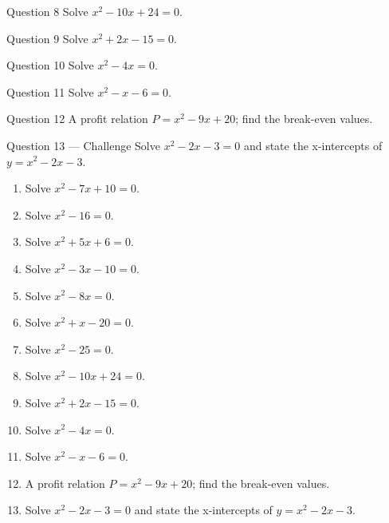 \documentclass[11pt]{article}
\begin{document}
\begin{qbox}{Question 8}
Solve $x^2-10x+24=0$.\workspace{2.4cm}
\end{qbox}

\begin{qbox}{Question 9}
Solve $x^2+2x-15=0$.\workspace{2.4cm}
\end{qbox}

\begin{qbox}{Question 10}
Solve $x^2-4x=0$.\workspace{2.4cm}
\end{qbox}

\begin{qbox}{Question 11}
Solve $x^2-x-6=0$.\workspace{2.4cm}
\end{qbox}

\begin{qbox}{Question 12}
A profit relation $P=x^2-9x+20$; find the break-even values.\workspace{2.4cm}
\end{qbox}

\begin{qbox}{Question 13 --- Challenge}
Solve $x^2-2x-3=0$ and state the x-intercepts of $y=x^2-2x-3$.\workspace{3cm}
\end{qbox}

\clearpage
{}

\begin{recapbox}
\begin{multicols}{2}
\small
\begin{enumerate}[leftmargin=*,itemsep=3pt]
  \item Solve $x^2-7x+10=0$.
  \item Solve $x^2-16=0$.
  \item Solve $x^2+5x+6=0$.
  \item Solve $x^2-3x-10=0$.
  \item Solve $x^2-8x=0$.
  \item Solve $x^2+x-20=0$.
  \item Solve $x^2-25=0$.
  \item Solve $x^2-10x+24=0$.
  \item Solve $x^2+2x-15=0$.
  \item Solve $x^2-4x=0$.
  \item Solve $x^2-x-6=0$.
  \item A profit relation $P=x^2-9x+20$; find the break-even values.
  \item Solve $x^2-2x-3=0$ and state the x-intercepts of $y=x^2-2x-3$.
\end{enumerate}
\end{multicols}
\end{recapbox}
\end{document}
